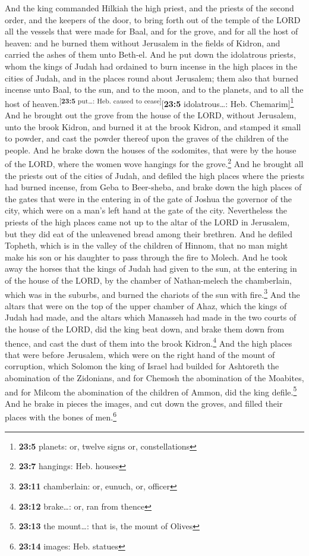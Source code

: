  And the king commanded Hilkiah the high priest, and the
priests of the second order, and the keepers of the door, to bring forth
out of the temple of the LORD all the vessels that were made for Baal,
and for the grove, and for all the host of heaven: and he burned them
without Jerusalem in the fields of Kidron, and carried the ashes of them
unto Beth-el.  And he put down the idolatrous priests,
whom the kings of Judah had ordained to burn incense in the high places
in the cities of Judah, and in the places round about Jerusalem; them
also that burned incense unto Baal, to the sun, and to the moon, and to
the planets, and to all the host of
heaven.\textsuperscript{{[}\textbf{23:5} put\ldots: Heb. caused to
cease{]}}{[}\textbf{23:5} idolatrous\ldots: Heb. Chemarim{]}\footnote{\textbf{23:5}
  planets: or, twelve signs or, constellations}  And he
brought out the grove from the house of the LORD, without Jerusalem,
unto the brook Kidron, and burned it at the brook Kidron, and stamped it
small to powder, and cast the powder thereof upon the graves of the
children of the people.  And he brake down the houses of
the sodomites, that were by the house of the LORD, where the women wove
hangings for the grove.\footnote{\textbf{23:7} hangings: Heb. houses}
 And he brought all the priests out of the cities of
Judah, and defiled the high places where the priests had burned incense,
from Geba to Beer-sheba, and brake down the high places of the gates
that were in the entering in of the gate of Joshua the governor of the
city, which were on a man's left hand at the gate of the city.
 Nevertheless the priests of the high places came not up
to the altar of the LORD in Jerusalem, but they did eat of the
unleavened bread among their brethren.  And he defiled
Topheth, which is in the valley of the children of Hinnom, that no man
might make his son or his daughter to pass through the fire to Molech.
 And he took away the horses that the kings of Judah had
given to the sun, at the entering in of the house of the LORD, by the
chamber of Nathan-melech the chamberlain, which was in the suburbs, and
burned the chariots of the sun with fire.\footnote{\textbf{23:11}
  chamberlain: or, eunuch, or, officer}  And the altars
that were on the top of the upper chamber of Ahaz, which the kings of
Judah had made, and the altars which Manasseh had made in the two courts
of the house of the LORD, did the king beat down, and brake them down
from thence, and cast the dust of them into the brook Kidron.\footnote{\textbf{23:12}
  brake\ldots: or, ran from thence}  And the high places
that were before Jerusalem, which were on the right hand of the mount of
corruption, which Solomon the king of Israel had builded for Ashtoreth
the abomination of the Zidonians, and for Chemosh the abomination of the
Moabites, and for Milcom the abomination of the children of Ammon, did
the king defile.\footnote{\textbf{23:13} the mount\ldots: that is, the
  mount of Olives}  And he brake in pieces the images,
and cut down the groves, and filled their places with the bones of
men.\footnote{\textbf{23:14} images: Heb. statues}

